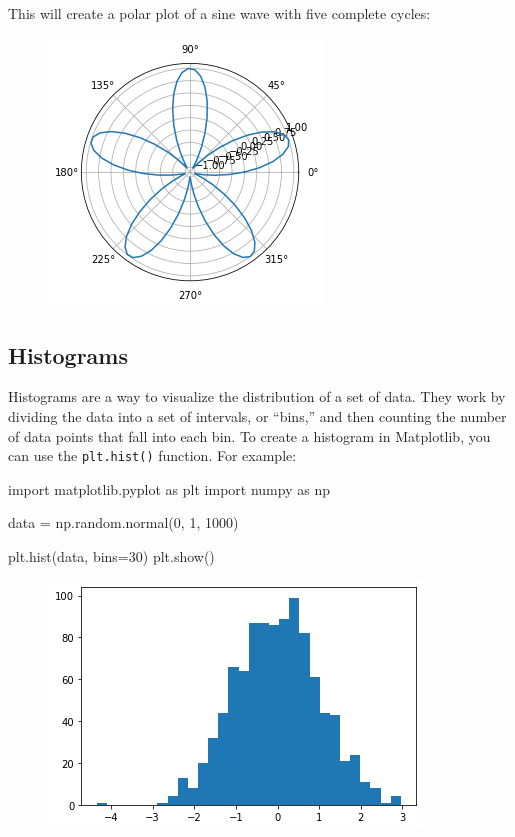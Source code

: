 \documentclass[11pt]{article}
\newenvironment{Shaded}{}{}
\newcommand{\DecValTok}[1]{\textcolor[rgb]{0.25,0.63,0.44}{{#1}}}
\newcommand{\NormalTok}[1]{{#1}}
\newcommand{\ImportTok}[1]{{#1}}
\newcommand{\OperatorTok}[1]{\textcolor[rgb]{0.40,0.40,0.40}{{#1}}}
\begin{document}
This will create a polar plot of a sine wave with five complete cycles:
\begin{figure}
  \centering
  \includegraphics[scale=0.6]{polar.png}
\end{figure}

\hypertarget{histograms}{%
\subsection{Histograms}\label{histograms}}

Histograms are a way to visualize the distribution of a set of data.
They work by dividing the data into a set of intervals, or ``bins,'' and
then counting the number of data points that fall into each bin. To
create a histogram in Matplotlib, you can use the \texttt{plt.hist()}
function. For example:

\begin{Shaded}
\begin{Highlighting}[]
\ImportTok{import}\NormalTok{ matplotlib.pyplot }\ImportTok{as}\NormalTok{ plt}
\ImportTok{import}\NormalTok{ numpy }\ImportTok{as}\NormalTok{ np}

\NormalTok{data }\OperatorTok{=}\NormalTok{ np.random.normal(}\DecValTok{0}\NormalTok{, }\DecValTok{1}\NormalTok{, }\DecValTok{1000}\NormalTok{)}

\NormalTok{plt.hist(data, bins}\OperatorTok{=}\DecValTok{30}\NormalTok{)}
\NormalTok{plt.show()}
\end{Highlighting}
\end{Shaded}

\begin{figure}
  \centering
  \includegraphics[scale=0.6]{hist.png} 
\end{figure}
\end{document}
